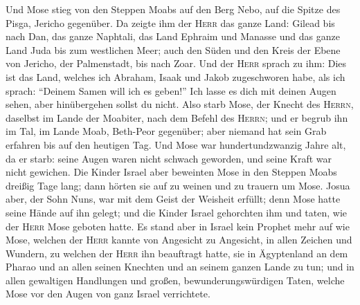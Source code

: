  Und Mose stieg von den Steppen Moabs auf den Berg Nebo,
auf die Spitze des Pisga, Jericho gegenüber. Da zeigte ihm der
\textsc{Herr} das ganze Land:  Gilead bis nach Dan, das
ganze Naphtali, das Land Ephraim und Manasse und das ganze Land Juda bis
zum westlichen Meer;  auch den Süden und den Kreis der
Ebene von Jericho, der Palmenstadt, bis nach Zoar.  Und
der \textsc{Herr} sprach zu ihm: Dies ist das Land, welches ich Abraham,
Isaak und Jakob zugeschworen habe, als ich sprach: ``Deinem Samen will
ich es geben!'' Ich lasse es dich mit deinen Augen sehen, aber
hinübergehen sollst du nicht.  Also starb Mose, der Knecht
des \textsc{Herrn}, daselbst im Lande der Moabiter, nach dem Befehl des
\textsc{Herrn};  und er begrub ihn im Tal, im Lande Moab,
Beth-Peor gegenüber; aber niemand hat sein Grab erfahren bis auf den
heutigen Tag.  Und Mose war hundertundzwanzig Jahre alt,
da er starb: seine Augen waren nicht schwach geworden, und seine Kraft
war nicht gewichen.  Die Kinder Israel aber beweinten Mose
in den Steppen Moabs dreißig Tage lang; dann hörten sie auf zu weinen
und zu trauern um Mose.  Josua aber, der Sohn Nuns, war
mit dem Geist der Weisheit erfüllt; denn Mose hatte seine Hände auf ihn
gelegt; und die Kinder Israel gehorchten ihm und taten, wie der
\textsc{Herr} Mose geboten hatte.  Es stand aber in
Israel kein Prophet mehr auf wie Mose, welchen der \textsc{Herr} kannte
von Angesicht zu Angesicht,  in allen Zeichen und
Wundern, zu welchen der \textsc{Herr} ihn beauftragt hatte, sie in
Ägyptenland an dem Pharao und an allen seinen Knechten und an seinem
ganzen Lande zu tun;  und in allen gewaltigen Handlungen
und großen, bewunderungswürdigen Taten, welche Mose vor den Augen von
ganz Israel verrichtete.

